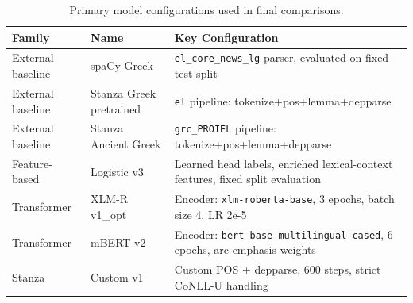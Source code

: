\begin{table}[H]

\centering

\caption{Primary model configurations used in final comparisons.}

\label{tab:model_configs}

\begin{tabular}{p{2.6cm}p{2.8cm}p{5.0cm}}

\toprule

Family & Name & Key Configuration \\

\midrule

External baseline & spaCy Greek & \texttt{el\_core\_news\_lg} parser, evaluated on fixed test split \\

External baseline & Stanza Greek pretrained & \texttt{el} pipeline: tokenize+pos+lemma+depparse \\

External baseline & Stanza Ancient Greek & \texttt{grc\_PROIEL} pipeline: tokenize+pos+lemma+depparse \\

Feature-based & Logistic v3 & Learned head labels, enriched lexical-context features, fixed split evaluation \\

Transformer & XLM-R v1\_opt & Encoder: \texttt{xlm-roberta-base}, 3 epochs, batch size 4, LR 2e-5 \\

Transformer & mBERT v2 & Encoder: \texttt{bert-base-multilingual-cased}, 6 epochs, arc-emphasis weights \\

Stanza & Custom v1 & Custom POS + depparse, 600 steps, strict CoNLL-U handling \\

\bottomrule

\end{tabular}

\end{table}

